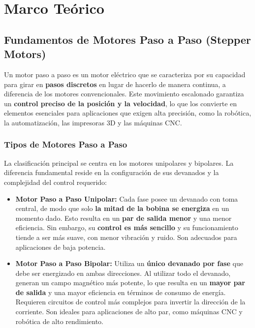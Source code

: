 

\chapter{Marco Teórico}

\section{Fundamentos de Motores Paso a Paso (Stepper Motors) \cite{LeiliMotor}}

Un motor paso a paso es un motor eléctrico que se caracteriza por su capacidad para girar en \textbf{pasos discretos} en lugar de hacerlo de manera continua, a diferencia de los motores convencionales. Este movimiento escalonado garantiza un \textbf{control preciso de la posición y la velocidad}, lo que los convierte en elementos esenciales para aplicaciones que exigen alta precisión, como la robótica, la automatización, las impresoras 3D y las máquinas CNC.

\subsection{Tipos de Motores Paso a Paso}

La clasificación principal se centra en los motores unipolares y bipolares. La diferencia fundamental reside en la configuración de sus devanados y la complejidad del control requerido:

\begin{itemize}
    \item \textbf{Motor Paso a Paso Unipolar:} Cada fase posee un devanado con toma central, de modo que solo \textbf{la mitad de la bobina se energiza} en un momento dado. Esto resulta en un \textbf{par de salida menor} y una menor eficiencia. Sin embargo, su \textbf{control es más sencillo} y su funcionamiento tiende a ser más suave, con menor vibración y ruido. Son adecuados para aplicaciones de baja potencia.
    \item \textbf{Motor Paso a Paso Bipolar:} Utiliza un \textbf{único devanado por fase} que debe ser energizado en ambas direcciones. Al utilizar todo el devanado, generan un campo magnético más potente, lo que resulta en un \textbf{mayor par de salida} y una mayor eficiencia en términos de consumo de energía. Requieren circuitos de control más complejos para invertir la dirección de la corriente. Son ideales para aplicaciones de alto par, como máquinas CNC y robótica de alto rendimiento.
\end{itemize}

